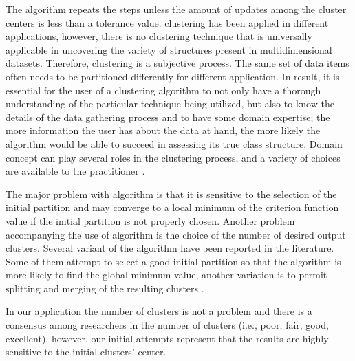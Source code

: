 {\color{gray}
	The algorithm repeats the steps unless the amount of updates among the cluster centers is less than a tolerance value.  \kmeans{} clustering has been applied in different applications, however, there is no clustering technique that is universally applicable in uncovering the variety of structures present in multidimensional datasets. Therefore, clustering is a subjective process. The same set of data items often needs to be partitioned differently for different application. In result, it is essential for the user of a clustering algorithm to not only have a thorough understanding of the particular technique being utilized, but also to know the details of the data gathering process and to have some domain expertise; the more information the user has about the data at hand, the more likely the algorithm would be able to succeed in assessing its true class structure. Domain concept can play several roles in the clustering process, and a variety of choices are available to the practitioner \citep{Jain_1999_ACMCS}. 

	The major problem with \kmeans{} algorithm is that it is sensitive to the selection of the initial partition and may converge to a local minimum of the criterion function value if the initial partition is not properly chosen. Another problem accompanying the use of \kmeans{} algorithm is the choice of the number of desired output clusters. Several variant of the \kmeans{} algorithm have been reported in the literature. Some of them attempt to select a good initial partition so that the algorithm is more likely to find the global minimum value, another variation is to permit splitting and merging of the resulting clusters \citep{Jain_1999_ACMCS}. 

	In our application the number of clusters is not a problem and there is a consensus among researchers in the number of clusters (i.e., poor, fair, good, excellent), however, our initial attempts represent that the results are highly sensitive to the initial clusters' center. 

}
